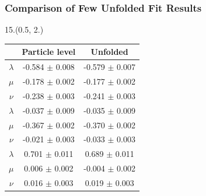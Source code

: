 \documentclass[12pt, xcolor={dvipsnames}, aspectratio = 169, sans, mathserif]{beamer}
\begin{document}
\begin{frame}
\frametitle{Comparison of Few Unfolded Fit Results}

\begin{textblock}{15.}(0.5, 2.)
\begin{center}

\begin{tabular}{|c c c|}
\hline
 & Particle level & Unfolded \\
\hline
$\lambda$ & -0.584 $\pm$ 0.008 & -0.579 $\pm$ 0.007 \\
$\mu$ & -0.178 $\pm$ 0.002 & -0.177 $\pm$ 0.002 \\
$\nu$ & -0.238 $\pm$ 0.003 & -0.241 $\pm$ 0.003 \\
\hline
$\lambda$ & -0.037 $\pm$ 0.009 & -0.035 $\pm$ 0.009 \\
$\mu$ & -0.367 $\pm$ 0.002 & -0.370 $\pm$ 0.002 \\
$\nu$ & -0.021 $\pm$ 0.003 & -0.033 $\pm$ 0.003 \\
\hline
$\lambda$ & 0.701 $\pm$ 0.011 & 0.689 $\pm$ 0.011 \\
$\mu$ & 0.006 $\pm$ 0.002 & -0.004 $\pm$ 0.002 \\
$\nu$ & 0.016 $\pm$ 0.003 & 0.019 $\pm$ 0.003 \\
\hline
\end{tabular}
\end{center}
\end{textblock}


\end{frame}
\end{document}
